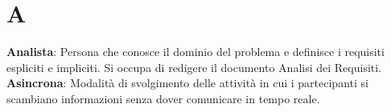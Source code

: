 \section{A}
\textbf{Analista}: Persona che conosce il dominio del problema e definisce i requisiti espliciti e impliciti. Si occupa di redigere il documento Analisi dei Requisiti.\\
\textbf{Asincrona}: Modalità di svolgimento delle attività in cui i partecipanti si scambiano informazioni senza dover comunicare in tempo reale.